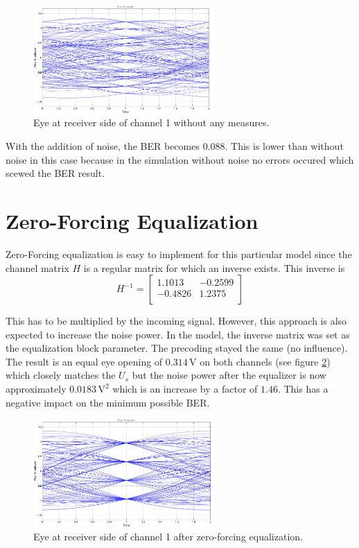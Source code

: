 \documentclass[10pt, a4paper]{article}
\begin{document}
\begin{figure}[h]
\centering
\includegraphics[width=0.618\textwidth]{graphics/mimo_eye_raw_ch_1.pdf}
\caption{Eye at receiver side of channel 1 without any measures.}\label{figure:raw1}
\end{figure}


With the addition of noise, the BER becomes $0.088$. This is lower than without noise in this case because in the simulation without noise no errors occured which scewed the BER result.



\section{Zero-Forcing Equalization}
Zero-Forcing equalization is easy to implement for this particular model since the channel matrix $H$ is a regular matrix for which an inverse exists. This inverse is
\[H^{-1} = \left[\begin{matrix}
                   1.1013 & -0.2599\\
                   -0.4826 & 1.2375\\
\end{matrix}\right]\]

This has to be multiplied by the incoming signal. However, this approach is also expected to increase the noise power.
In the model, the inverse matrix was set as the equalization block parameter. The precoding stayed the same (no influence). The result is an equal eye opening of $0.314\,\si{\volt}$ on both channels (see figure \ref{fig:zf1}) which closely matches the $U_{s}$ but the noise power after the equalizer is now approximately $0.0183\,\si{\volt\squared}$ which is an increase by a factor of $1.46$. This has a negative impact on the minimum possible BER.\\

\begin{figure}[h]
\centering
\includegraphics[width=0.618\textwidth]{graphics/mimo_eye_zeroforcing_ch_1.pdf}
\caption{Eye at receiver side of channel 1 after zero-forcing equalization.}\label{fig:zf1}
\end{figure}
\end{document}
